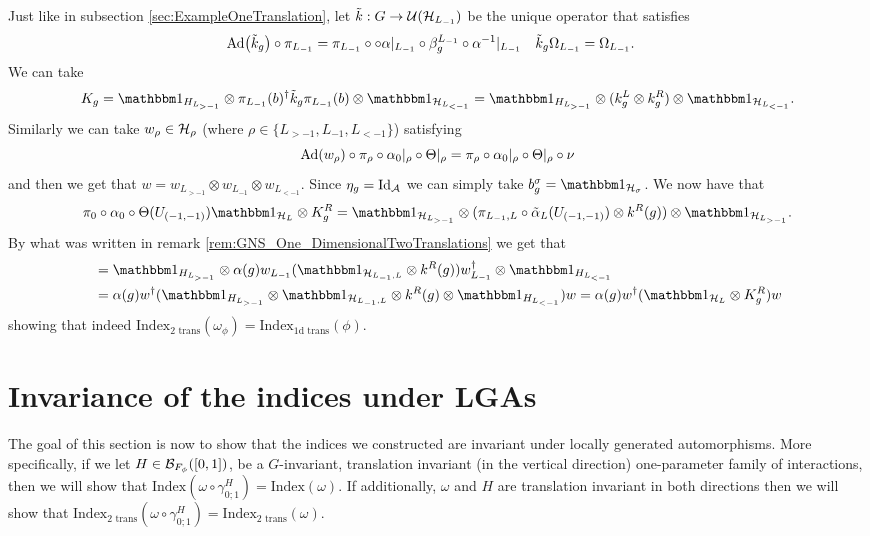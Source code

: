 \documentclass[11pt,a4paper,twoside]{article}
\numberwithin{equation}{section}
\begin{document}
	Just like in subsection \ref{sec:ExampleOneTranslation}, let $\tilde k:G\rightarrow \UU(\HH_{L_{-1}})$ be the unique operator that satisfies
	\begin{align}
		\Ad{\tilde{k}_g}\circ\pi_{L_{-1}}&=\pi_{L_{-1}}\circ \circ\alpha|_{L_{-1}}\circ\beta_g^{L_{-1}}\circ \alpha^{-1}|_{L_{-1}}&\tilde k_g\Omega_{L_{-1}}&=\Omega_{L_{-1}}.
	\end{align}
	We can take
	\begin{equation}
		K_g=\id_{H_{L_{>-1}}}\otimes \pi_{L_{-1}}(b)^\dagger \tilde k_g \pi_{L_{-1}}(b) \otimes\id_{\HH_{L_{<-1}}} =\id_{H_{L_{>-1}}}\otimes (k_g^L\otimes k_g^R) \otimes\id_{\HH_{L_{<-1}}}.
	\end{equation}
	Similarly we can take $w_\rho\in\HH_\rho$ (where $\rho\in\{L_{>-1},L_{-1},L_{<-1}\}$) satisfying
	\begin{equation}
		\Ad{w_\rho}\circ\pi_\rho\circ\alpha_{0}|_\rho\circ\Theta|_\rho=\pi_\rho\circ\alpha_{0}|_\rho\circ\Theta|_\rho\circ\nu
	\end{equation}
	and then we get that $w=w_{L_{>-1}}\otimes w_{L_{-1}}\otimes w_{L_{<-1}}$. Since $\eta_g=\textrm{Id}_{\AA}$ we can simply take $b_g^\sigma=\id_{\HH_\sigma}$. We now have that
	\begin{equation}
		\pi_0\circ\alpha_0\circ\Theta(U_{(-1,-1)})\id_{\HH_L}\otimes K_g^R=\id_{\HH_{L_{>-1}}}\otimes(\pi_{L_{-1},L}\circ\tilde\alpha_L(U_{(-1,-1)})\otimes k^R(g))\otimes\id_{\HH_{L_{>-1}}}.
	\end{equation}
	By what was written in remark \ref{rem:GNS_One_DimensionalTwoTranslations} we get that
	\begin{align}
		&=\id_{H_{L_{>-1}}}\otimes\alpha(g) w_{L_{-1}}(\id_{\HH_{L_{-1},L}}\otimes k^R(g))w_{L_{-1}}^\dagger\otimes \id_{H_{L_{<-1}}}\\
		&=\alpha(g)w^\dagger (\id_{H_{L_{>-1}}}\otimes \id_{\HH_{L_{-1},L}}\otimes k^R(g)\otimes \id_{H_{L_{<-1}}}) w=\alpha(g)w^\dagger (\id_{\HH_L}\otimes K^R_g) w
	\end{align}
	showing that indeed $\textrm{Index}_{\text{2 trans}}(\omega_\phi)=\textrm{Index}_{\text{1d trans}}(\phi)$.
	\section{Invariance of the indices under LGAs}\label{sec:AllIndicesInvariantUnderLGA}
	The goal of this section is now to show that the indices we constructed are invariant under locally generated automorphisms. More specifically, if we let $H\in\BB_{F_\phi}([0,1])$, be a $G$-invariant, translation invariant (in the vertical direction) one-parameter family of interactions, then we will show that $\textrm{Index}(\omega\circ\gamma^H_{0;1})=\textrm{Index}(\omega)$. If additionally, $\omega$ and $H$ are translation invariant in both directions then we will show that $\textrm{Index}_{\text{2 trans}}(\omega\circ\gamma^H_{0;1})=\textrm{Index}_{\text{2 trans}}(\omega)$.
\end{document}
